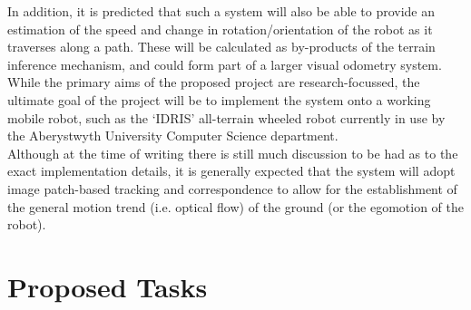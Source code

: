 \documentclass[10pt,fleqn,twoside]{article}
\begin{document}
In addition, it is predicted that such a system will also be able to provide an estimation of the speed and change in rotation/orientation of the robot as it traverses along a path. These will be calculated as by-products of the terrain inference mechanism, and could form part of a larger visual odometry system. \\

While the primary aims of the proposed project are research-focussed, the ultimate goal of the project will be to implement the system onto a working mobile robot, such as the `IDRIS' all-terrain wheeled robot currently in use by the Aberystwyth University Computer Science department. \\

Although at the time of writing there is still much discussion to be had as to the exact implementation details, it is generally expected that the system will adopt image patch-based tracking and correspondence to allow for the establishment of the general motion trend (i.e. optical flow) of the ground (or the egomotion of the robot).



\section{Proposed Tasks}

\end{document}
